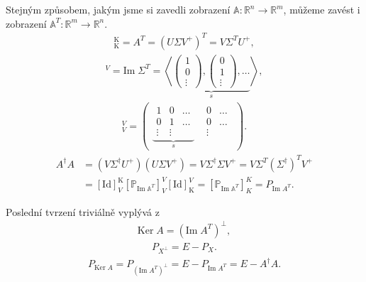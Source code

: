 \documentclass[]{article}
\newcommand{\Ker}{\mathrm{Ker}\;}
\renewcommand{\Im}{\mathrm{Im}\;}
\newcommand{\Id}[2]{\ensuremath{[\mathrm{Id}]_{#1}^{#2}}}
\newcommand{\mat}[1]{\begin{pmatrix}#1\end{pmatrix}}
\begin{document}
Stejným způsobem, jakým jsme si zavedli zobrazení $\mathbb{A}: \mathbb{R}^n \rightarrow \mathbb{R}^m$, můžeme zavést i zobrazení $\mathbb{A}^T: \mathbb{R}^m \rightarrow \mathbb{R}^n$.
\begin{align*}
  [\mathbb{A}^T]_\mathrm{K}^\mathrm{K}
  = A^T = (U \Sigma V^+)^T
  = V \Sigma^T U^+,
\end{align*}
\begin{align*}
  [\Im \mathbb{A}^T]^V = \Im \Sigma^T = \left\langle
  \underbrace{
    \mat{1 \\ 0 \\ \vdots},
    \mat{0 \\ 1 \\ \vdots},
    \dots
  }_s
\right\rangle,
\end{align*}
\begin{align*}
  [\mathbb{P}_{\Im\mathbb{A}^T}]_V^V =
  \mat{
    \underbrace{
      \begin{matrix}
        1 & 0 & \dots \\
        0 & 1 & \dots \\
        \vdots & \vdots
      \end{matrix}
    }_s
    &
    \begin{matrix}
      0 & \dots \\
      0 & \dots \\
      \vdots
    \end{matrix}
  }.
\end{align*}
\begin{align*}
  A^\dagger A
  &= (V \Sigma^\dagger U^+)(U \Sigma V^+)
  = V \Sigma^\dagger \Sigma V^+
  = V \Sigma^T (\Sigma^\dagger)^T V^+ \\
  &= \Id{V}{\mathrm{K}} [\mathbb{P}_{\Im\mathbb{A}^T}]_V^V \Id{\mathrm{K}}{V}
  = [\mathbb{P}_{\Im\mathbb{A}^T}]_K^K
  = P_{\Im A^T}.
\end{align*}

\medskip

Poslední tvrzení triviálně vyplývá z
\begin{align*}
  \Ker A = (\Im A^T)^\perp,
\end{align*}
\begin{align*}
  P_{X^\perp} = E - P_X.
\end{align*}
\begin{align*}
  P_{\Ker A} = P_{(\Im A^T)^\perp} = E - P_{\Im A^T} = E - A^\dagger A.
\end{align*}



\endgroup
\end{document}
